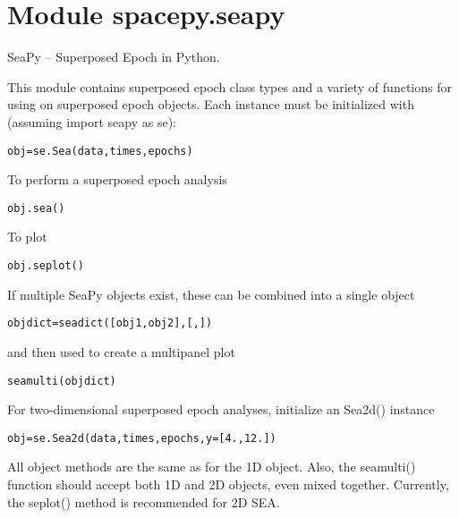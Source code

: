 %
%
%


\section{Module spacepy.seapy}

    \label{spacepy:seapy}
SeaPy -- Superposed Epoch in Python.

This module contains superposed epoch class types and a variety of 
functions for using on superposed epoch objects. Each instance must be 
initialized with (assuming import seapy as se):

\begin{alltt}
\pysrcprompt{{\textgreater}{\textgreater}{\textgreater} }obj = se.Sea(data, times, epochs)\end{alltt}
To perform a superposed epoch analysis

\begin{alltt}
\pysrcprompt{{\textgreater}{\textgreater}{\textgreater} }obj.sea()\end{alltt}
To plot

\begin{alltt}
\pysrcprompt{{\textgreater}{\textgreater}{\textgreater} }obj.seplot()\end{alltt}
If multiple SeaPy objects exist, these can be combined into a single object

\begin{alltt}
\pysrcprompt{{\textgreater}{\textgreater}{\textgreater} }objdict = seadict([obj1, obj2],[,])\end{alltt}
and then used to create a multipanel plot

\begin{alltt}
\pysrcprompt{{\textgreater}{\textgreater}{\textgreater} }seamulti(objdict)\end{alltt}
For two-dimensional superposed epoch analyses, initialize an Sea2d() 
instance

\begin{alltt}
\pysrcprompt{{\textgreater}{\textgreater}{\textgreater} }obj = se.Sea2d(data, times, epochs, y=[4., 12.])\end{alltt}
All object methods are the same as for the 1D object. Also, the seamulti() 
function should accept both 1D and 2D objects, even mixed together. 
Currently, the seplot() method is recommended for 2D SEA.

